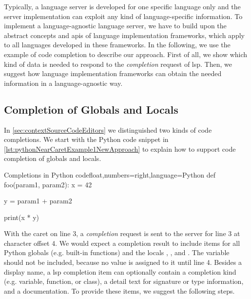 \documentclass[sigplan,10pt,review,anonymous]{acmart}
\begin{document}
Typically, a language server is developed for one specific language only and the
server implementation can exploit any kind of language-specific information. To
implement a language-agnostic language server, we have to build upon the
abstract concepts and \acp{api} of language implementation frameworks, which
apply to all languages developed in these frameworks.  In the following, we use
the example of code completion to describe our approach. First of all, we show
which kind of data is needed to respond to the \emph{completion} request of
\ac{lsp}. Then, we suggest how language implementation frameworks can obtain the
needed information in a language-agnostic way.

\subsection{Completion of Globals and Locals}
\label{sec:newApproach:completionOfGlobals}

In \autoref{sec:contextSourceCodeEditors} we distinguished two kinds of code
completions. We start with the Python code snippet in
\autoref{lst:pythonNearCaretExample1NewApproach} to explain how to support code
completion of globals and locals.

\begin{code}{Completions in Python code}{float,numbers=right,language=Python}
def foo(param1, param2):
    x = 42

    y = param1 + param2

    print(x * y)
\end{code}

With the caret on line 3, a \emph{completion} request is sent to the server for
line 3 at character offset 4. We would expect a completion result to include
items for all Python globals (e.g. built-in functions) and the locals
, , and . The variable
 should not be included, because no value is assigned to it until
line 4. Besides a display name, a \ac{lsp} completion item can optionally
contain a completion kind (e.g. variable, function, or class), a detail text for
signature or type information, and a documentation. To provide these items, we
suggest the following steps.
\end{document}
